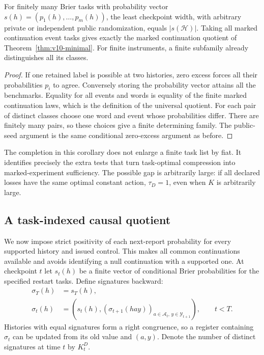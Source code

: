 \begin{corollary}
\label{cor:v11-completion}
For finitely many Brier tasks with probability vector
$s(h)=(p_1(h),\ldots,p_m(h))$, the least checkpoint width, with arbitrary
private or independent public randomization, equals
$|s(\mathcal H)|$. Taking all marked continuation event tasks gives
exactly the marked continuation quotient of
Theorem~\ref{thm:v10-minimal}. For finite instruments, a finite subfamily
already distinguishes all its classes.
\end{corollary}

\begin{proof}
If one retained label is possible at two histories, zero excess forces
all their probabilities $p_i$ to agree. Conversely storing the probability
vector attains all the benchmarks. Equality for all events and words is
equality of the finite marked continuation laws, which is the definition
of the universal quotient. For each pair of distinct classes choose one
word and event whose probabilities differ. There are finitely many pairs,
so these choices give a finite determining family. The public-seed
argument is the same conditional zero-excess argument as before.
\end{proof}

The completion in this corollary does not enlarge a finite task list by
fiat. It identifies precisely the extra tests that turn task-optimal
compression into marked-experiment sufficiency. The possible gap is
arbitrarily large: if all declared losses have the same optimal constant
action, $\tau_D=1$, even when $K$ is arbitrarily large.

\subsection{A task-indexed causal quotient}
We now impose strict positivity of each next-report probability for every
supported history and issued control. This makes all common continuations
available and avoids identifying a null continuation with a supported one.
At checkpoint $t$ let $s_t(h)$ be a finite vector of conditional Brier
probabilities for the specified restart tasks. Define signatures backward:
\begin{align}
 \sigma_T(h)&=s_T(h),\nonumber\\
 \sigma_t(h)&=\left(s_t(h),
       (\sigma_{t+1}(hay))_{a\in\mathcal A_t,\,y\in\mathcal Y_{t+1}}
             \right),\qquad t<T.
 \label{eq:v11-signature}
\end{align}
Histories with equal signatures form a right congruence, so a register
containing $\sigma_t$ can be updated from its old value and $(a,y)$.
Denote the number of distinct signatures at time $t$ by $K_t^D$.

